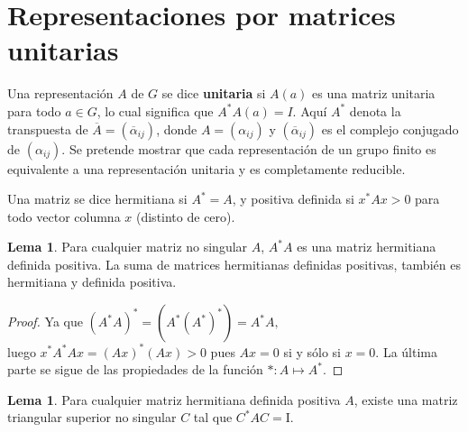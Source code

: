 \documentclass[12pt]{book}
\theoremstyle{definition}
\newtheorem{lemma}[theorem]{Lema}
\newcounter{in}
\newcounter{ini}
\begin{document}
\section{Representaciones por matrices unitarias}
\label{sec:munitarias}

Una representación $A$ de $G$ se dice \textbf{unitaria} si $A\left(a\right)$ es
una matriz unitaria para todo $a \in G$, lo cual significa que
$A^{*}A\left(a\right)=I$. Aquí $A^{*}$ denota la transpuesta de
$\overline{A}=\left(\overline{\alpha}_{ij}\right)$, donde
$A=\left(\alpha_{ij}\right)$ y $\left(\overline{\alpha}_{ij}\right)$
es el complejo conjugado de $\left(\alpha_{ij}\right)$. Se pretende
mostrar que cada representación de un grupo finito es equivalente a
una representación unitaria y es completamente reducible.

Una matriz se dice hermitiana si $A^{*}=A$, y positiva definida si
$x^{*}Ax>0$ para todo vector columna $x$ (distinto de cero).

\begin{lemma}
  \label{l2_1}
  Para cualquier matriz no singular $A$, $A^{*}A$ es una matriz
  hermitiana definida positiva. La suma de matrices hermitianas
  definidas positivas, también es hermitiana y definida positiva.
  \begin{proof}
  Ya que $(A^{*}A)^{*} = (A^{*}(A^{*})^{*}) = A^{*}A,$ \\
  luego $x^{*}A^{*}Ax = (Ax)^{*}(Ax)>0$ pues $Ax = 0$ si y sólo si $x = 0$. La última parte se sigue de las propiedades de la función $* \colon A \mapsto A^{*}$.
  \end{proof}  

\end{lemma}

\begin{lemma}
  \label{l2_2}
   Para cualquier matriz hermitiana definida positiva
$A$, existe una matriz triangular superior no singular $C$ tal que
$C^{*}AC=\mathrm{I}$.
\end{lemma}
\end{document}
